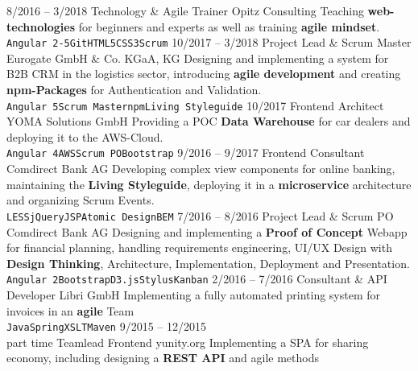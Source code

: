\documentclass[9pt]{developercv} %
\begin{document}
\begin{entrylist}
  \entry
		{8/2016 -- 3/2018}
		{Technology \& Agile Trainer}
		{Opitz Consulting}
		{
      Teaching \textbf{web-technologies} for beginners and experts as well as training \textbf{agile mindset}.\\
      \texttt{Angular 2-5}\slashsep\texttt{Git}\slashsep\texttt{HTML5}\slashsep\texttt{CSS3}\slashsep\texttt{Scrum}
    }
  \entry
		{10/2017 -- 3/2018}
		{Project Lead \& Scrum Master}
		{Eurogate GmbH \& Co. KGaA, KG}
		{
      Designing and implementing a system for B2B CRM in the logistics sector, introducing \textbf{agile development} and 
      creating \textbf{npm-Packages} for Authentication and Validation.\\ 
      \texttt{Angular 5}\slashsep\texttt{Scrum Master}\slashsep\texttt{npm}\slashsep\texttt{Living Styleguide}
    }
  \entry
		{10/2017}
		{Frontend Architect}
		{YOMA Solutions GmbH}
		{
      Providing a POC \textbf{Data Warehouse} for car dealers and deploying it to the AWS-Cloud.\\
      \texttt{Angular 4}\slashsep\texttt{AWS}\slashsep\texttt{Scrum PO}\slashsep\texttt{Bootstrap}
    }
  \entry
		{9/2016 -- 9/2017}
		{Frontend Consultant}
		{Comdirect Bank AG}
		{
      Developing complex view components for online banking, maintaining the \textbf{Living Styleguide},
      deploying it in a \textbf{microservice} architecture and organizing Scrum Events.\\
      \texttt{LESS}\slashsep\texttt{jQuery}\slashsep\texttt{JSP}\slashsep\texttt{Atomic Design}\slashsep\texttt{BEM}
    }
  \entry
		{7/2016 -- 8/2016}
		{Project Lead \& Scrum PO}
		{Comdirect Bank AG}
		{
      Designing and implementing a \textbf{Proof of Concept} Webapp for financial planning, handling
      requirements engineering, UI/UX Design with \textbf{Design Thinking}, Architecture, Implementation, Deployment
      and Presentation.\\
      \texttt{Angular 2}\slashsep\texttt{Bootstrap}\slashsep\texttt{D3.js}\slashsep\texttt{Stylus}\slashsep\texttt{Kanban}
    }
  \entry
		{2/2016 -- 7/2016}
		{Consultant \& API Developer}
		{Libri GmbH}
		{
      Implementing a fully automated printing system for invoices in an \textbf{agile} Team\\
      \texttt{Java}\slashsep\texttt{Spring}\slashsep\texttt{XSLT}\slashsep\texttt{Maven}
    }
  \entry
		{9/2015 -- 12/2015\\\footnotesize{part time}}
		{Teamlead Frontend}
		{yunity.org}
		{
      Implementing a SPA for sharing economy, including designing a \textbf{REST API} and agile methods\\
}
\end{entrylist}
\end{document}
